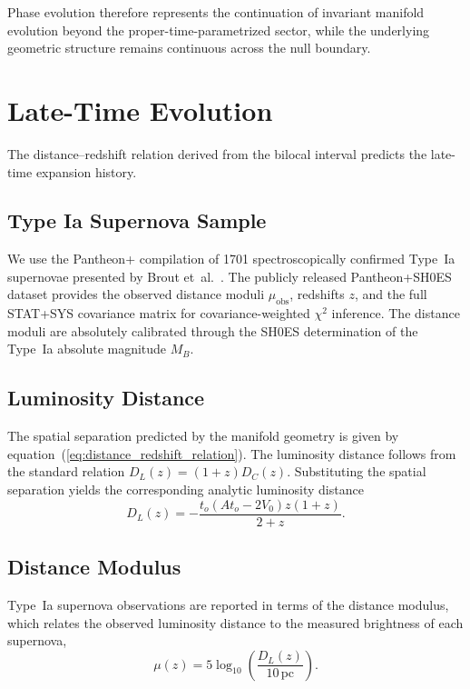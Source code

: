 \documentclass[fontsize=12pt, paper=a4]{scrartcl}
\begin{document}
Phase evolution therefore represents the continuation of invariant manifold evolution beyond the proper-time-parametrized sector, while the underlying geometric structure remains continuous across the null boundary.

\section{Late-Time Evolution}

The distance--redshift relation derived from the bilocal interval predicts the late-time expansion history.

\subsection{Type Ia Supernova Sample}

We use the Pantheon+ compilation of 1701 spectroscopically confirmed Type~Ia supernovae presented by Brout et~al.~\cite{Brout2022}. The publicly released Pantheon+SH0ES dataset provides the observed distance moduli $\mu_{\mathrm{obs}}$, redshifts $z$, and the full STAT+SYS covariance matrix for covariance-weighted $\chi^2$ inference. The distance moduli are absolutely calibrated through the SH0ES determination of the Type~Ia absolute magnitude $M_B$.

\subsection{Luminosity Distance}

The spatial separation predicted by the manifold geometry is given by equation~(\ref{eq:distance_redshift_relation}). The luminosity distance follows from the standard relation $D_L(z) = (1+z)D_C(z)$. Substituting the spatial separation yields the corresponding analytic luminosity distance
\begin{equation}
D_L(z) =-\frac{t_o\left(A t_o - 2V_0\right) z(1+z)}{2+z}.
\label{eq:pme_luminosity_distance}
\end{equation}

\subsection{Distance Modulus}

Type~Ia supernova observations are reported in terms of the distance modulus, which relates the observed luminosity distance to the measured brightness of each supernova,
\begin{equation}
\mu(z) = 5\log_{10}\!\left(\frac{D_L(z)}{10\,\mathrm{pc}}\right).
\end{equation}
\end{document}
